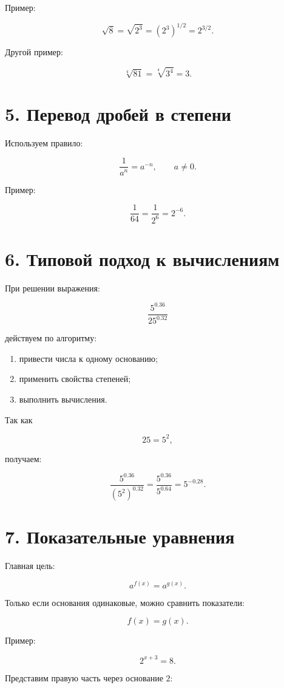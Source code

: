 \documentclass[a4paper,12pt]{article}
\begin{document}
Пример:

\[
\sqrt8
=
\sqrt{2^3}
=
(2^3)^{1/2}
=
2^{3/2}.
\]

Другой пример:

\[
\sqrt[4]{81}
=
\sqrt[4]{3^4}
=
3.
\]

\section*{5. Перевод дробей в степени}

Используем правило:

\[
\frac1{a^n}=a^{-n},
\qquad a\neq0.
\]

Пример:

\[
\frac1{64}
=
\frac1{2^6}
=
2^{-6}.
\]

\section*{6. Типовой подход к вычислениям}

При решении выражения:

\[
\frac{5^{0.36}}{25^{0.32}}
\]

действуем по алгоритму:

\begin{enumerate}
\item привести числа к одному основанию;
\item применить свойства степеней;
\item выполнить вычисления.
\end{enumerate}

Так как

\[
25=5^2,
\]

получаем:

\[
\frac{5^{0.36}}{(5^2)^{0.32}}
=
\frac{5^{0.36}}{5^{0.64}}
=
5^{-0.28}.
\]

\section*{7. Показательные уравнения}

Главная цель:

\[
a^{f(x)}=a^{g(x)}.
\]

Только если основания одинаковые, можно сравнить показатели:

\[
f(x)=g(x).
\]

Пример:

\[
2^{x+3}=8.
\]

Представим правую часть через основание $2$:
\end{document}
